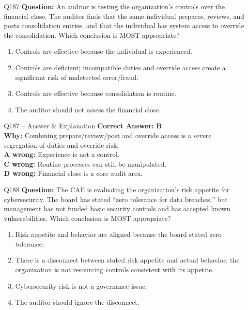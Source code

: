 \documentclass[aspectratio=169,10pt]{beamer}
\begin{document}
	\begin{frame}[t]{Q187}
		\small
		\textbf{Question:} An auditor is testing the organization's controls over the financial close. The auditor finds that the same individual prepares, reviews, and posts consolidation entries, and that the individual has system access to override the consolidation. Which conclusion is MOST appropriate?
		\begin{enumerate}[label=\Alph*.,itemsep=1pt,topsep=2pt]
			\item Controls are effective because the individual is experienced.
			\item Controls are deficient; incompatible duties and override access create a significant risk of undetected error/fraud.
			\item Controls are effective because consolidation is routine.
			\item The auditor should not assess the financial close.
		\end{enumerate}
	\end{frame}
	
	\begin{frame}[t]{Q187 -- Answer \& Explanation}
		\small
		\textbf{Correct Answer: B} \\[4pt]
		\textbf{Why:} Combining prepare/review/post and override access is a severe segregation-of-duties and override risk. \\[4pt]
		\textbf{A wrong:} Experience is not a control. \\[2pt]
		\textbf{C wrong:} Routine processes can still be manipulated. \\[2pt]
		\textbf{D wrong:} Financial close is a core audit area.
	\end{frame}
	
	\begin{frame}[t]{Q188}
		\small
		\textbf{Question:} The CAE is evaluating the organization's risk appetite for cybersecurity. The board has stated ``zero tolerance for data breaches,'' but management has not funded basic security controls and has accepted known vulnerabilities. Which conclusion is MOST appropriate?
		\begin{enumerate}[label=\Alph*.,itemsep=1pt,topsep=2pt]
			\item Risk appetite and behavior are aligned because the board stated zero tolerance.
			\item There is a disconnect between stated risk appetite and actual behavior; the organization is not resourcing controls consistent with its appetite.
			\item Cybersecurity risk is not a governance issue.
			\item The auditor should ignore the disconnect.
		\end{enumerate}
	\end{frame}
	
\end{document}
